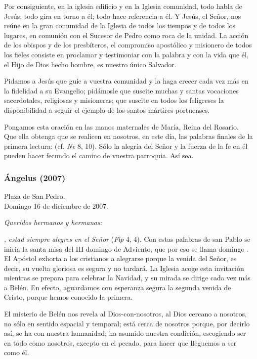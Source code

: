 Por consiguiente, en la iglesia edificio y en la Iglesia comunidad, todo habla de Jesús; todo gira en torno a él; todo hace referencia a él. Y Jesús, el Señor, nos reúne en la gran comunidad de la Iglesia de todos los tiempos y de todos los lugares, en comunión con el Sucesor de Pedro como roca de la unidad. La acción de los obispos y de los presbíteros, el compromiso apostólico y misionero de todos los fieles consiste en proclamar y testimoniar con la palabra y con la vida que él, el Hijo de Dios hecho hombre, es nuestro único Salvador.

Pidamos a Jesús que guíe a vuestra comunidad y la haga crecer cada vez más en la fidelidad a su Evangelio; pidámosle que suscite muchas y santas vocaciones sacerdotales, religiosas y misioneras; que suscite en todos los feligreses la disponibilidad a seguir el ejemplo de los santos mártires portuenses.

Pongamos esta oración en las manos maternales de María, Reina del Rosario. Que ella obtenga que se realicen en nosotros, en este día, las palabras finales de la primera lectura:  (cf. \emph{Ne} 8, 10). Sólo la alegría del Señor y la fuerza de la fe en él pueden hacer fecundo el camino de vuestra parroquia. Así sea.

\subsubsection{Ángelus (2007)}  
	
Plaza de San Pedro.\\ Domingo 16 de diciembre de 2007.


\emph{Queridos hermanos y hermanas:} 

\emph{, estad siempre alegres en el Señor} (\emph{Flp} 4, 4). Con estas palabras de san Pablo se inicia la santa misa del III domingo de Adviento, que por eso se llama domingo \emph{}. El Apóstol exhorta a los cristianos a alegrarse porque la venida del Señor, es decir, su vuelta gloriosa es segura y no tardará. La Iglesia acoge esta invitación mientras se prepara para celebrar la Navidad, y su mirada se dirige cada vez más a Belén. En efecto, aguardamos con esperanza segura la segunda venida de Cristo, porque hemos conocido la primera.

El misterio de Belén nos revela al Dios-con-nosotros, al Dios cercano a nosotros, no sólo en sentido espacial y temporal; está cerca de nosotros porque, por decirlo así, se ha  con nuestra humanidad; ha asumido nuestra condición, escogiendo ser en todo como nosotros, excepto en el pecado, para hacer que lleguemos a ser como él.

